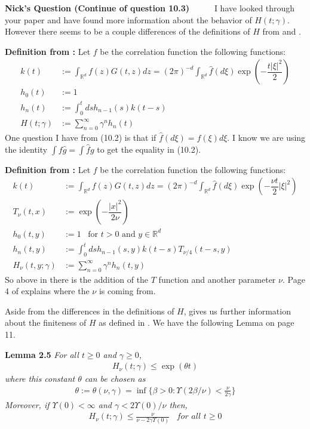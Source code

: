 \documentclass[a4paper,11pt]{article}
\theoremstyle{plain}
\theoremstyle{definition}
\newcounter{NQ}
\newenvironment{NickQuestion}[1][] %
  {\refstepcounter{NQ}
  \begin{mdframed}[backgroundcolor=lightgray]\textbf{Nick's Question \theNQ \: #1~~}~~~\noindent}%
  {\end{mdframed}}
\numberwithin{NQ}{section}
\numberwithin{LQ}{section}
\numberwithin{ZQ}{section}
\begin{document}
\begin{NickQuestion}[(Continue of question 10.3)]
I have looked through your paper \cite{CK15SHE} and have found more information about the behavior of $H(t;\gamma)$. However there seems to be a couple differences of the definitions of $H$ from \cite{CK15SHE} and \cite{CH16Comparison}. 

\textbf{Definition from \cite{CH16Comparison}:} Let $f$ be the correlation function the following functions: 
\begin{align}
      k(t)&:= \int_{\mathbb R^d}f(z)G(t,z)dz = (2\pi)^{-d}\int_{\mathbb R^d}\hat{f}(d\xi)\exp\left(-\dfrac{t|\xi|^2}{2}\right)
  \\  h_0(t)&:=1
  \\  h_n(t)&:=\int_0^tds h_{n-1}(s)k(t-s)
  \\  H(t;\gamma)&:= \sum_{n=0}^\infty \gamma^nh_n(t)
    \end{align}
One question I have from (10.2) is that if $\hat{f}(d\xi) = f(\xi)d\xi$. I know we are using the identity $\int f\hat g = \int \hat f g$ to get the equality in (10.2).

\vspace{.05in}

\textbf{Definition from \cite{CK15SHE}:}  Let $f$ be the correlation function the following functions: 
\begin{align}
   k(t)&:= \int_{\mathbb R^d}f(z)G(t,z)dz = (2\pi)^{-d}\int_{\mathbb R^d}\hat{f}(d\xi)\exp\left(-\dfrac{\nu t}{2}|\xi|^2\right)
  \\ T_\nu(t,x)&:=\exp\left(-\dfrac{|x|^2}{2\nu}\right)
  \\  h_0(t,y)&:=1 \;\;\; \text{for $t>0$ and $y\in \mathbb R^d$}
  \\  h_n(t,y)&:=\int_0^tds h_{n-1}(s,y)k(t-s)T_{\nu/4}(t-s,y)
  \\  H_\nu(t,y;\gamma)&:= \sum_{n=0}^\infty \gamma^nh_n(t,y)
\end{align}
So above in \cite{CK15SHE} there is the addition of the $T$ function and another parameter $\nu$. Page 4 of \cite{CK15SHE} explains where the $\nu$ is coming from. 

Aside from the differences in the definitions of $H$, \cite{CK15SHE} gives us further information about the finiteness of $H$ as defined in \cite{CK15SHE}. We have the following Lemma on page 11. 

\vspace{.05in} 

 \textbf{Lemma 2.5} \textit{For all $t\ge 0$ and $\gamma \ge 0$,} 
\begin{align}
H_\nu(t;\gamma) \le \exp(\theta t)
\end{align}
\textit{where this constant $\theta$ can be chosen as}
\begin{align}
\theta := \theta(\nu,\gamma)=\inf\{\beta >0 : \Upsilon(2\beta/\nu)<\frac{\nu}{2\gamma}\}
\end{align}
\textit{Moreover, if $\Upsilon(0) < \infty$ and $\gamma <2\Upsilon(0)/\nu$ then,}
\begin{align}
    H_\nu(t;\gamma)\le\frac{\nu}{\nu- 2\gamma \Upsilon(0)} \;\;\; \textit{for all $t \ge 0$}
\end{align}


\end{NickQuestion}
\end{document}
